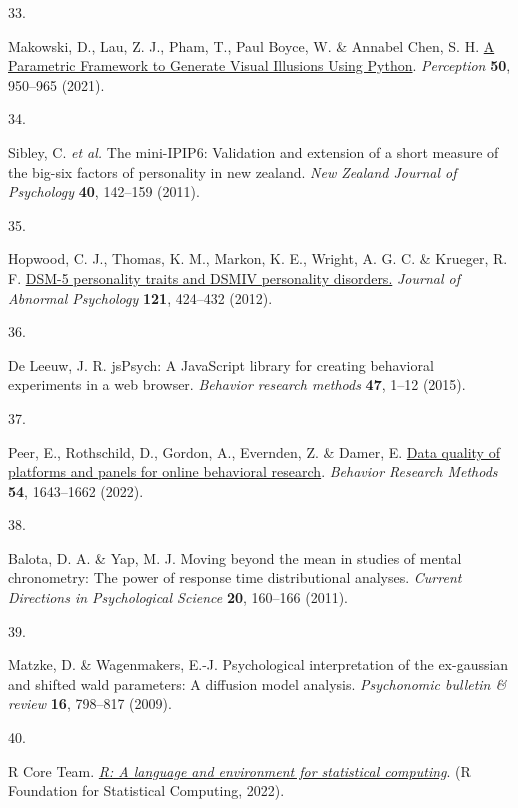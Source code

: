 \documentclass[
  man,floatsintext]{apa6}
\newlength{\cslhangindent}
\newlength{\csllabelwidth}
\newlength{\cslentryspacingunit} %
\newenvironment{CSLReferences}[2] %
 {%
  \setlength{\parindent}{0pt}
  \ifodd #1
  \let\oldpar\par
  \def\par{\hangindent=\cslhangindent\oldpar}
  \fi
  \setlength{\parskip}{#2\cslentryspacingunit}
 }%
 {}
\newcommand{\CSLLeftMargin}[1]{\parbox[t]{\csllabelwidth}{#1}}
\newcommand{\CSLRightInline}[1]{\parbox[t]{\linewidth - \csllabelwidth}{#1}\break}
\begin{document}
\begin{CSLReferences}{0}{0}
\leavevmode{}%
\CSLLeftMargin{33. }%
\CSLRightInline{Makowski, D., Lau, Z. J., Pham, T., Paul Boyce, W. \& Annabel Chen, S. H. \href{https://doi.org/10.1177/03010066211057347}{A Parametric Framework to Generate Visual Illusions Using Python}. \emph{Perception} \textbf{50}, 950--965 (2021).}

\leavevmode{}%
\CSLLeftMargin{34. }%
\CSLRightInline{Sibley, C. \emph{et al.} The mini-IPIP6: Validation and extension of a short measure of the big-six factors of personality in new zealand. \emph{New Zealand Journal of Psychology} \textbf{40}, 142--159 (2011).}

\leavevmode{}%
\CSLLeftMargin{35. }%
\CSLRightInline{Hopwood, C. J., Thomas, K. M., Markon, K. E., Wright, A. G. C. \& Krueger, R. F. \href{https://doi.org/10.1037/a0026656}{DSM-5 personality traits and DSM{\textendash}IV personality disorders.} \emph{Journal of Abnormal Psychology} \textbf{121}, 424--432 (2012).}

\leavevmode{}%
\CSLLeftMargin{36. }%
\CSLRightInline{De Leeuw, J. R. jsPsych: A JavaScript library for creating behavioral experiments in a web browser. \emph{Behavior research methods} \textbf{47}, 1--12 (2015).}

\leavevmode{}%
\CSLLeftMargin{37. }%
\CSLRightInline{Peer, E., Rothschild, D., Gordon, A., Evernden, Z. \& Damer, E. \href{https://doi.org/10.3758/s13428-021-01694-3}{Data quality of platforms and panels for online behavioral research}. \emph{Behavior Research Methods} \textbf{54}, 1643--1662 (2022).}

\leavevmode{}%
\CSLLeftMargin{38. }%
\CSLRightInline{Balota, D. A. \& Yap, M. J. Moving beyond the mean in studies of mental chronometry: The power of response time distributional analyses. \emph{Current Directions in Psychological Science} \textbf{20}, 160--166 (2011).}

\leavevmode{}%
\CSLLeftMargin{39. }%
\CSLRightInline{Matzke, D. \& Wagenmakers, E.-J. Psychological interpretation of the ex-gaussian and shifted wald parameters: A diffusion model analysis. \emph{Psychonomic bulletin \& review} \textbf{16}, 798--817 (2009).}

\leavevmode{}%
\CSLLeftMargin{40. }%
\CSLRightInline{R Core Team. \emph{\href{https://www.R-project.org/}{R: A language and environment for statistical computing}}. (R Foundation for Statistical Computing, 2022).}


\end{CSLReferences}
\end{document}
